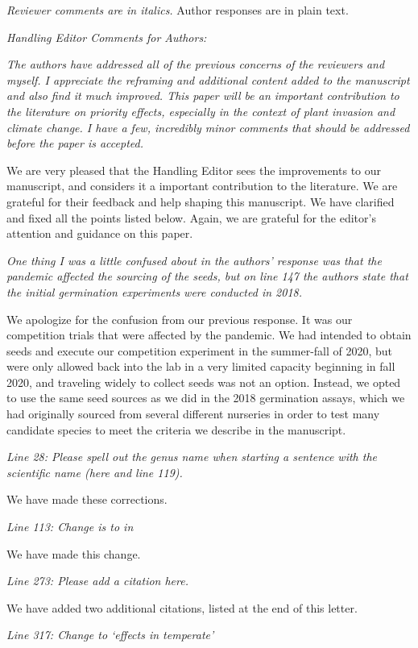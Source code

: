 \documentclass[11pt]{article}
\begin{document}
\emph{Reviewer comments are in italics.} Author responses are in plain text. 

\emph{Handling Editor Comments for Authors:}

\emph{The authors have addressed all of the previous concerns of the reviewers and myself. I appreciate the reframing and additional content added to the manuscript and also find it much improved. This paper will be an important contribution to the literature on priority effects, especially in the context of plant invasion and climate change. I have a few, incredibly minor comments that should be addressed before the paper is accepted.} 

We are very pleased that the Handling Editor sees the improvements to our manuscript, and considers it a important contribution to the literature. We are grateful for their feedback and help shaping this manuscript. We have clarified and fixed all the points listed below. Again, we are grateful for the editor's attention and guidance on this paper.

\emph{One thing I was a little confused about in the authors’ response was that the pandemic affected the sourcing of the seeds, but on line 147 the authors state that the initial germination experiments were conducted in 2018.}

We apologize for the confusion from our previous response. It was our competition trials that were affected by the pandemic. We had intended to obtain seeds and execute our competition experiment in the summer-fall of 2020, but were only allowed back into the lab in a very limited capacity beginning in fall 2020, and traveling widely to collect seeds was not an option. Instead, we opted to use the same seed sources as we did in the 2018 germination assays, which we had originally sourced from several different nurseries in order to test many candidate species to meet the criteria we describe in the manuscript.

\emph{Line 28: Please spell out the genus name when starting a sentence with the scientific name (here and line 119).}

We have made these corrections.

\emph{Line 113: Change is to in}

We have made this change.

\emph {Line 273: Please add a citation here.}

We have added two additional citations, listed at the end of this letter.

\emph{Line 317: Change to `effects in temperate'}
\end{document}
